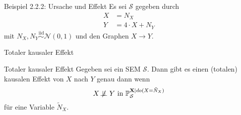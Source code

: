 \begin{frame}[t]{Beispiel 2.2.2: Ursache und Effekt}
    Es sei $\mathcal{S}$ gegeben durch
    \begin{align}
        X &= N_X\\
        Y &= 4 \cdot X + N_Y
    \end{align}
    mit $N_X, N_Y \overset{\text{iid}}{\sim} \mathcal{N}(0, 1)$ und den
    Graphen $X \rightarrow Y$.
\end{frame}


\begin{frame}{Totaler kausaler Effekt}
    \begin{block}{Totaler kausaler Effekt}
        Gegeben sei ein SEM $\mathcal{S}$. Dann gibt es einen
        (totalen) kausalen Effekt von $X$ nach $Y$ genau dann wenn
        \[X \not\!\perp\!\!\!\perp Y \text{ in } \mathbb{P}_\mathcal{S}^{\mathbf{X}|do(X=\tilde{N}_X)}\]
        für eine Variable $\tilde{N}_X$.
    \end{block}
\end{frame}

